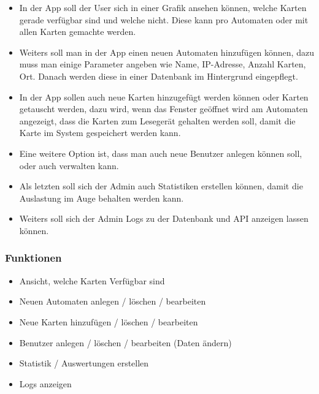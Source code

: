 \documentclass[a4paper]{article}
\begin{document}
\begin{itemize}
  \item In der App soll der User sich in einer Grafik ansehen können, welche Karten gerade verfügbar sind und welche nicht. Diese kann pro Automaten oder mit allen Karten gemachte werden. 
  \item Weiters soll man in der App einen neuen Automaten hinzufügen können, dazu muss man einige Parameter angeben wie Name, IP-Adresse, Anzahl Karten, Ort. Danach werden diese in einer Datenbank im Hintergrund eingepflegt. 
  \item In der App sollen auch neue Karten hinzugefügt werden können oder Karten getauscht werden, dazu wird, wenn das Fenster geöffnet wird am Automaten angezeigt, dass die Karten zum Lesegerät gehalten werden soll, damit die Karte im System gespeichert werden kann.
  \item Eine weitere Option ist, dass man auch neue Benutzer anlegen können soll, oder auch verwalten kann.
  \item Als letzten soll sich der Admin auch Statistiken erstellen können, damit die Auslastung im Auge behalten werden kann.
  \item Weiters soll sich der Admin Logs zu der Datenbank und API anzeigen lassen können.
\end{itemize}

\subsubsection{Funktionen}
\begin{itemize}
 \item Ansicht, welche Karten Verfügbar sind
 \item Neuen Automaten anlegen / löschen / bearbeiten 
 \item Neue Karten hinzufügen / löschen / bearbeiten
 \item Benutzer anlegen / löschen / bearbeiten (Daten ändern)
 \item Statistik / Auswertungen erstellen
 \item Logs anzeigen
\end{itemize}
\end{document}
